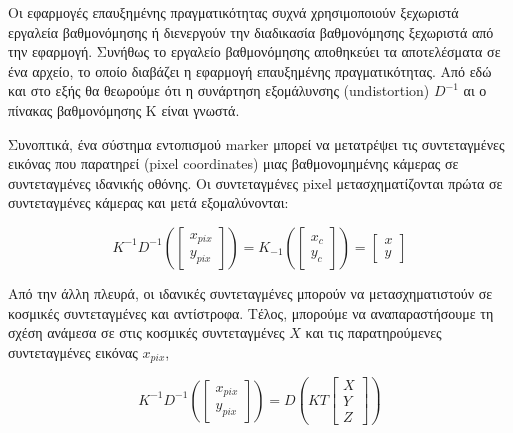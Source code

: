 Οι εφαρμογές επαυξημένης πραγματικότητας συχνά χρησιμοποιούν ξεχωριστά εργαλεία βαθμονόμησης ή διενεργούν την διαδικασία βαθμονόμησης ξεχωριστά από την εφαρμογή. Συνήθως το εργαλείο βαθμονόμησης αποθηκεύει τα αποτελέσματα σε ένα αρχείο, το οποίο διαβάζει η εφαρμογή επαυξημένης πραγματικότητας. Από εδώ και στο εξής θα θεωρούμε ότι η συνάρτηση εξομάλυνσης (undistortion) $D^{-1}$ αι ο πίνακας βαθμονόμησης Κ είναι γνωστά. 


Συνοπτικά, ένα σύστημα εντοπισμού marker μπορεί να μετατρέψει τις συντεταγμένες εικόνας που παρατηρεί (pixel coordinates) μιας βαθμονομημένης κάμερας σε συντεταγμένες ιδανικής οθόνης. Οι συντεταγμένες pixel μετασχηματίζονται πρώτα σε συντεταγμένες κάμερας και μετά εξομαλύνονται:

\begin{equation}
K^{-1}D^{-1} 
\left (\begin{bmatrix}
x_{pix}\\ 
y_{pix}
\end{bmatrix}  \right )
=K_{-1}
\left (\begin{bmatrix}
x_{c}\\ 
y_{c}
\end{bmatrix}  \right )
=
\begin{bmatrix}
x\\ 
y
\end{bmatrix}
\end{equation}

Από την άλλη πλευρά, οι ιδανικές συντεταγμένες μπορούν να μετασχηματιστούν σε κοσμικές συντεταγμένες και αντίστροφα. Τέλος, μπορούμε να αναπαραστήσουμε τη σχέση ανάμεσα σε στις κοσμικές συντεταγμένες $X$ και τις παρατηρούμενες συντεταγμένες εικόνας $x_{pix}$,

\begin{equation}
K^{-1}D^{-1} 
\left (\begin{bmatrix}
x_{pix}\\ 
y_{pix}
\end{bmatrix}  \right )
=D
\left (KT \begin{bmatrix}
X\\ 
Y\\
Z
\end{bmatrix}  \right )
\end{equation}











